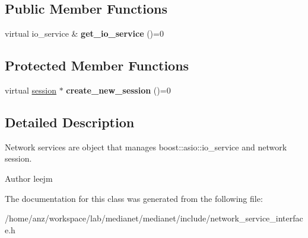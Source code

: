 \subsection*{Public Member Functions}
\begin{DoxyCompactItemize}
\item 
\mbox{\label{classmedianet_1_1network__service__interface_ad6bb1489cb005ea12bd210080c99a0be}} 
virtual io\+\_\+service \& {\bfseries get\+\_\+io\+\_\+service} ()=0
\end{DoxyCompactItemize}
\subsection*{Protected Member Functions}
\begin{DoxyCompactItemize}
\item 
\mbox{\label{classmedianet_1_1network__service__interface_a951d00b17cf7021c2f66d29495b46880}} 
virtual \mbox{\hyperlink{classmedianet_1_1session}{session}} $\ast$ {\bfseries create\+\_\+new\+\_\+session} ()=0
\end{DoxyCompactItemize}


\subsection{Detailed Description}
Network services are object that manages boost\+::asio\+::io\+\_\+service and network session. 

\begin{DoxyAuthor}{Author}
leejm 
\end{DoxyAuthor}


The documentation for this class was generated from the following file\+:\begin{DoxyCompactItemize}
\item 
/home/anz/workspace/lab/medianet/medianet/include/network\+\_\+service\+\_\+interface.\+h\end{DoxyCompactItemize}

